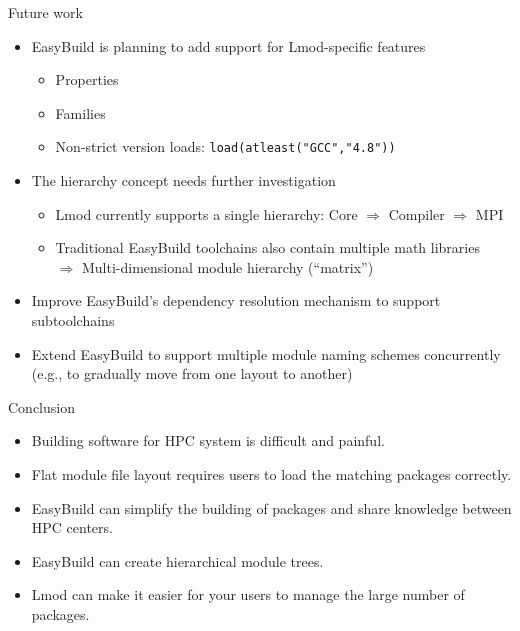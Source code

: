 \documentclass[10pt,xcolor={usenames,dvipsnames}]{beamer}
\begin{document}
\begin{frame}{Future work}
\begin{itemize}
    \item
        EasyBuild is planning to add support for Lmod-specific features
        \begin{itemize}
            \item
                Properties
            \item
                Families
            \item
                Non-strict version loads: \texttt{load(atleast("GCC","4.8"))}
        \end{itemize}
    \smallskip
    \item
        The hierarchy concept needs further investigation
        \begin{itemize}
            \item
                Lmod currently supports a single hierarchy:
                Core $\Rightarrow$ Compiler $\Rightarrow$ MPI
            \item
                Traditional EasyBuild toolchains also contain multiple math
                libraries\\
                $\Rightarrow$ Multi-dimensional module hierarchy (``matrix'')
        \end{itemize}
    \smallskip
    \item
        Improve EasyBuild's dependency resolution mechanism to support
        subtoolchains
    \smallskip
    \item
        Extend EasyBuild to support multiple module naming schemes concurrently
        (e.g., to gradually move from one layout to another)
\end{itemize}
\end{frame}


\begin{frame}{Conclusion}
\begin{itemize}
    \item
        Building software for HPC system is difficult and painful.
    \item
        Flat module file layout requires users to load the matching
        packages correctly.
    \item
        EasyBuild can simplify the building of packages and share
        knowledge between HPC centers.
    \item
        EasyBuild can create hierarchical module trees.
    \item
        Lmod can make it easier for your users to manage the large
        number of packages.
\end{itemize}
\end{frame}
\end{document}
